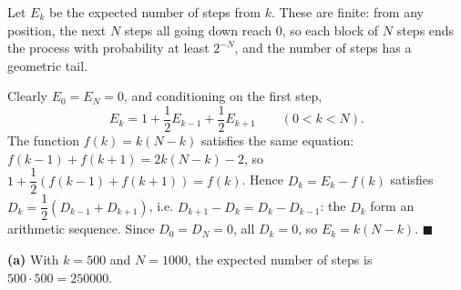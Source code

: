 Let $E_k$ be the expected number of steps from $k$. These are finite: from any position, the next $N$ steps all going down reach $0$, so each block of $N$ steps ends the process with probability at least $2^{-N}$, and the number of steps has a geometric tail.

Clearly $E_0=E_N=0$, and conditioning on the first step,
\[E_k=1+\dfrac12E_{k-1}+\dfrac12E_{k+1}\qquad(0<k<N).\]
The function $f(k)=k(N-k)$ satisfies the same equation: $f(k-1)+f(k+1)=2k(N-k)-2$, so $1+\dfrac12\left(f(k-1)+f(k+1)\right)=f(k)$. Hence $D_k=E_k-f(k)$ satisfies $D_k=\dfrac12\left(D_{k-1}+D_{k+1}\right)$, i.e. $D_{k+1}-D_k=D_k-D_{k-1}$: the $D_k$ form an arithmetic sequence. Since $D_0=D_N=0$, all $D_k=0$, so $E_k=k(N-k)$. $\blacksquare$

\textbf{(a)} With $k=500$ and $N=1000$, the expected number of steps is $500\cdot500=\boxed{250000}$.
